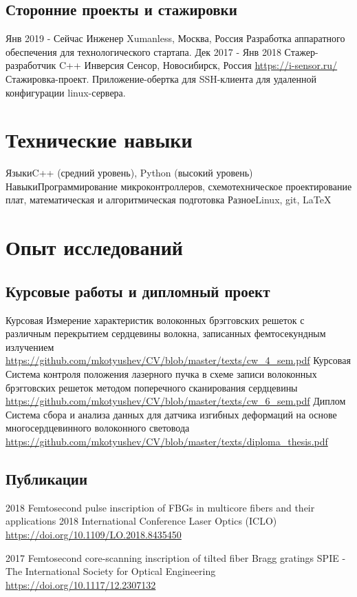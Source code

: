 \documentclass[11pt,a4paper]{moderncv}
\begin{document}
\subsection{Сторонние проекты и стажировки}
\cventry
  {Янв 2019 - Сейчас}
  {Инженер}
  {\newline{}Xumanless, Москва, Россия}
  {}{}
  {Разработка аппаратного обеспечения для технологического стартапа.}
\cventry
  {Дек 2017 - Янв 2018}
  {Стажер-разработчик C++}
  {\newline{}Инверсия Сенсор, Новосибирск, Россия}
  {\newline{}\url{https://i-sensor.ru/}}{}
  {Стажировка-проект. Приложение-обертка для SSH-клиента для удаленной конфигурации linux-сервера.}

\section{Технические навыки}
\cvline
  {Языки}{C++ (средний уровень), Python (высокий уровень)}
\cvline
  {Навыки}{Программирование микроконтроллеров, схемотехническое проектирование плат, математическая и алгоритмическая подготовка}
\cvline
  {Разное}{Linux, git, LaTeX}

\section{Опыт исследований}
  \subsection{Курсовые работы и дипломный проект}
  \cventry
    {Курсовая}
    {Измерение характеристик волоконных брэгговских решеток с различным перекрытием сердцевины волокна, записанных фемтосекундным излучением}
    {\newline\url{https://github.com/mkotyushev/CV/blob/master/texts/cw_4_sem.pdf}}{}{}{}
  \cventry
    {Курсовая}
    {Система контроля положения лазерного пучка в схеме записи волоконных брэгговских решеток методом поперечного сканирования сердцевины}
    {\newline\url{https://github.com/mkotyushev/CV/blob/master/texts/cw_6_sem.pdf}}{}{}{}
  \cventry
    {Диплом}
    {Система сбора и анализа данных для датчика изгибных деформаций на основе многосердцевинного волоконного световода}
    {\newline\url{https://github.com/mkotyushev/CV/blob/master/texts/diploma_thesis.pdf}}{}{}{}
  \subsection{Публикации}
  \cventry
    {2018}
    {Femtosecond pulse inscription of FBGs in multicore fibers and their applications}
    {\newline{}2018 International Conference Laser Optics (ICLO)}
    {\newline\url{https://doi.org/10.1109/LO.2018.8435450}}
    {}{}

  \cventry
    {2017}
    {Femtosecond core-scanning inscription of tilted fiber Bragg gratings}
    {\newline{}SPIE - The International Society for Optical Engineering}
    {\newline\url{https://doi.org/10.1117/12.2307132}}
    {}{}
\end{document}
